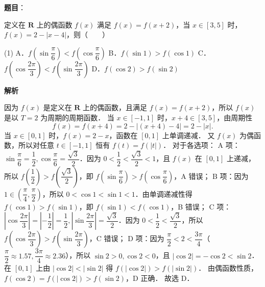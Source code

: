 \begin{answer}

\textbf{题目}：

定义在 $\mathbf{R}$ 上的偶函数 $f(x)$ 满足 $f(x) = f(x + 2)$，当 $x \in [3, 5]$ 时，$f(x) = 2 - |x - 4|$，则\mbox{（　　）}

\begin{gkopts}(1)
\task A．$f\left(\sin\dfrac{\pi}{6}\right) < f\left(\cos\dfrac{\pi}{6}\right)$
\task B．$f(\sin 1) > f(\cos 1)$
\task C．$f\left(\cos\dfrac{2\pi}{3}\right) < f\left(\sin\dfrac{2\pi}{3}\right)$
\task D．$f(\cos 2) > f(\sin 2)$
\end{gkopts}

\textbf{解析}

因为 $f(x)$ 是定义在 $\mathbf{R}$ 上的偶函数，且满足 $f(x) = f(x + 2)$，所以 $f(x)$ 是以 $T = 2$ 为周期的周期函数．
当 $x \in [-1, 1]$ 时，$x + 4 \in [3, 5]$，由周期性
\nopagebreak[4]
\[
f(x) = f(x + 4) = 2 - |(x + 4) - 4| = 2 - |x|.
\]
当 $x \in [0, 1]$ 时，$f(x) = 2 - x$，函数在 $[0, 1]$ 上单调递减．
又 $f(x)$ 为偶函数，所以对任意 $t \in [-1, 1]$ 恒有 $f(t) = f(|t|)$．
对于各选项：
A 项：$\sin\dfrac{\pi}{6} = \dfrac{1}{2}, \cos\dfrac{\pi}{6} = \dfrac{\sqrt{3}}{2}$．因为 $0 < \dfrac{1}{2} < \dfrac{\sqrt{3}}{2} < 1$，且 $f(x)$ 在 $[0, 1]$ 上递减，所以 $f\left(\dfrac{1}{2}\right) > f\left(\dfrac{\sqrt{3}}{2}\right)$，即 $f\left(\sin\dfrac{\pi}{6}\right) > f\left(\cos\dfrac{\pi}{6}\right)$，A 错误；
B 项：因为 $1 \in \left(\dfrac{\pi}{4}, \dfrac{\pi}{2}\right)$，所以 $0 < \cos 1 < \sin 1 < 1$．由单调递减性得 $f(\cos 1) > f(\sin 1)$，即 $f(\sin 1) < f(\cos 1)$，B 错误；
C 项：$\left|\cos\dfrac{2\pi}{3}\right| = \left|-\dfrac{1}{2}\right| = \dfrac{1}{2}, \left|\sin\dfrac{2\pi}{3}\right| = \dfrac{\sqrt{3}}{2}$．因为 $0 < \dfrac{1}{2} < \dfrac{\sqrt{3}}{2}$，所以 $f\left(\cos\dfrac{2\pi}{3}\right) > f\left(\sin\dfrac{2\pi}{3}\right)$，C 错误；
D 项：因为 $\dfrac{\pi}{2} < 2 < \dfrac{3\pi}{4}$（$\dfrac{\pi}{2} \approx 1.57, \dfrac{3\pi}{4} \approx 2.36$），所以 $\sin 2 > 0, \cos 2 < 0$，且 $|\cos 2| = -\cos 2 < \sin 2$．
在 $[0, 1]$ 上由 $|\cos 2| < |\sin 2|$ 得 $f(|\cos 2|) > f(|\sin 2|)$．
由偶函数性质，$f(\cos 2) = f(|\cos 2|) > f(\sin 2)$，D 正确．
故选 D．


\end{answer}
